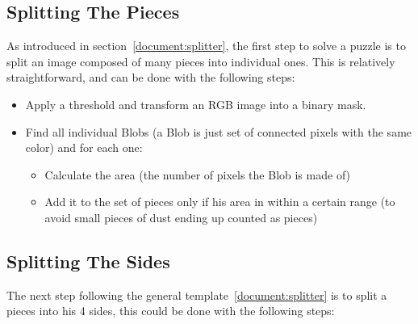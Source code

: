 \documentclass{article}
\begin{document}
\subsection{Splitting The Pieces}
As introduced in section~\ref{document:splitter}, the first step to solve a puzzle
is to split an image composed of many pieces into individual ones.
This is relatively straightforward, and can be done with the following steps:

\begin{itemize}
  \item Apply a threshold and transform an RGB image into a binary mask.
  \item Find all individual Blobs
  (a Blob is just set of connected pixels with the same color) and for each one:

  \begin{itemize}
  \item Calculate the area (the number of pixels the Blob is made of)

  \item Add it to the set of pieces only if his area in within a certain range (to avoid small pieces of dust ending up counted as pieces)

  \end{itemize}

\end{itemize}

\subsection{Splitting The Sides}

The next step following the general template~\ref{document:splitter}
is to split a pieces into
his 4 sides, this could be done with the following steps:
\end{document}
